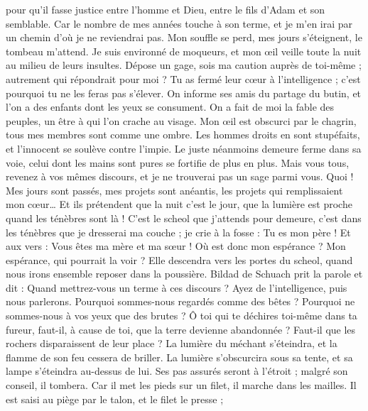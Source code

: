 \begin{multicols}{2}
pour qu'il fasse justice entre l'homme et Dieu, entre le fils d'Adam et son semblable.
Car le nombre de mes années touche à son terme, et je m'en irai par un chemin d'où je ne reviendrai pas.
\VerseOne{}Mon souffle se perd, mes jours s'éteignent, le tombeau m'attend.
Je suis environné de moqueurs, et mon œil veille toute la nuit au milieu de leurs insultes.
Dépose un gage, sois ma caution auprès de toi-même ; autrement qui répondrait pour moi ?
Tu as fermé leur cœur à l'intelligence ; c'est pourquoi tu ne les feras pas s'élever.
On informe ses amis du partage du butin, et l'on a des enfants dont les yeux se consument.
On a fait de moi la fable des peuples, un être à qui l'on crache au visage.
Mon œil est obscurci par le chagrin, tous mes membres sont comme une ombre.
Les hommes droits en sont stupéfaits, et l'innocent se soulève contre l'impie.
Le juste néanmoins demeure ferme dans sa voie, celui dont les mains sont pures se fortifie de plus en plus.
Mais vous tous, revenez à vos mêmes discours, et je ne trouverai pas un sage parmi vous.
Quoi ! Mes jours sont passés, mes projets sont anéantis, les projets qui remplissaient mon cœur…
Et ils prétendent que la nuit c'est le jour, que la lumière est proche quand les ténèbres sont là !
C'est le scheol que j'attends pour demeure, c'est dans les ténèbres que je dresserai ma couche ;
je crie à la fosse : Tu es mon père ! Et aux vers : Vous êtes ma mère et ma sœur !
Où est donc mon espérance ? Mon espérance, qui pourrait la voir ?
Elle descendra vers les portes du scheol, quand nous irons ensemble reposer dans la poussière.
\VerseOne{}Bildad de Schuach prit la parole et dit :
Quand mettrez-vous un terme à ces discours ? Ayez de l'intelligence, puis nous parlerons.
Pourquoi sommes-nous regardés comme des bêtes ? Pourquoi ne sommes-nous à vos yeux que des brutes ?
Ô toi qui te déchires toi-même dans ta fureur, faut-il, à cause de toi, que la terre devienne abandonnée ? Faut-il que les rochers disparaissent de leur place ?
La lumière du méchant s'éteindra, et la flamme de son feu cessera de briller.
La lumière s'obscurcira sous sa tente, et sa lampe s'éteindra au-dessus de lui.
Ses pas assurés seront à l'étroit ; malgré son conseil, il tombera.
Car il met les pieds sur un filet, il marche dans les mailles.
Il est saisi au piège par le talon, et le filet le presse ;

\end{multicols}
